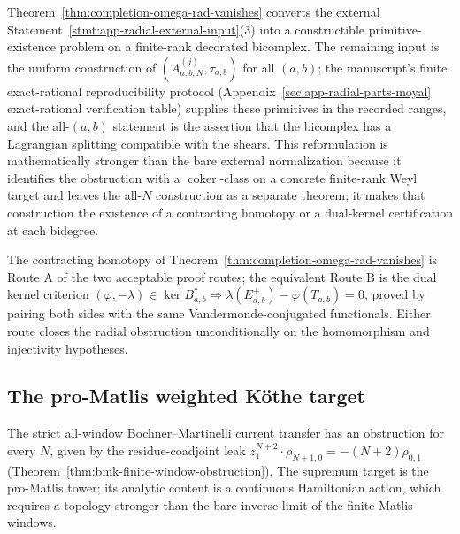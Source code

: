 \begin{rmk}
\label{rmk:completion-omega-rad-status}
Theorem~\ref{thm:completion-omega-rad-vanishes} converts the
external Statement~\ref{stmt:app-radial-external-input}(3) into a
constructible primitive-existence problem on a finite-rank
decorated bicomplex.  The remaining input is the uniform
construction of \((A^{(j)}_{a,b,N},\tau_{a,b})\) for all
\((a,b)\); the manuscript's finite exact-rational reproducibility
protocol (Appendix~\ref{sec:app-radial-parts-moyal} exact-rational
verification table) supplies these primitives in the recorded ranges, and
the all-\((a,b)\) statement is the assertion that the bicomplex
has a Lagrangian splitting compatible with the shears.  This
reformulation is mathematically stronger than the bare external
normalization because it identifies the obstruction with a
\(\operatorname{coker}\)-class on a concrete finite-rank Weyl
target and leaves the all-\(N\) construction as a separate theorem; it
makes that construction the existence of a
contracting homotopy or a dual-kernel certification at each
bidegree.
\end{rmk}

\begin{rmk}
\label{rmk:completion-dual-kernel}
The contracting homotopy of
Theorem~\ref{thm:completion-omega-rad-vanishes} is Route A of the
two acceptable proof routes; the equivalent Route B is the dual
kernel criterion
\((\varphi,-\lambda)\in\ker B^*_{a,b}\Rightarrow
\lambda(E^+_{a,b})-\varphi(T_{a,b})=0\), proved by pairing both
sides with the same Vandermonde-conjugated functionals.  Either
route closes the radial obstruction unconditionally on the
homomorphism and injectivity hypotheses.
\end{rmk}

\subsection{The pro-Matlis weighted K\"othe target}
\label{ssec:completion-promatlis}

The strict all-window Bochner--Martinelli current transfer has an
obstruction for every \(N\), given by the residue-coadjoint leak
\(z_1^{N+2}\cdot\rho_{N+1,0}=-(N+2)\rho_{0,1}\)
(Theorem~\ref{thm:bmk-finite-window-obstruction}).  The supremum target is
the pro-Matlis tower; its analytic content is a continuous
Hamiltonian action, which requires a topology stronger than the bare
inverse limit of the finite Matlis windows.

